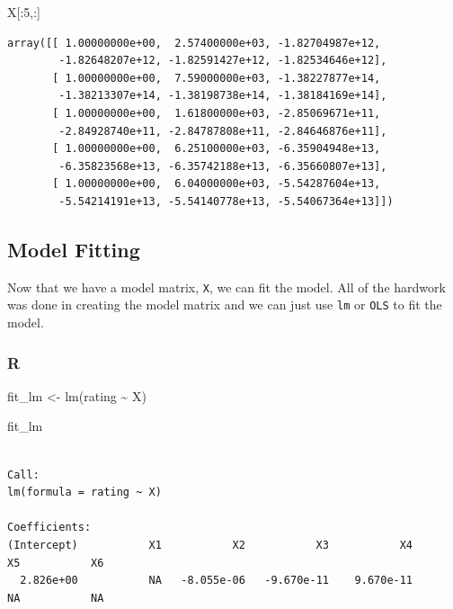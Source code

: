 \documentclass[
  letterpaper,
]{krantz}
\newenvironment{Shaded}{}{}
\newcommand{\DecValTok}[1]{\textcolor[rgb]{0.25,0.63,0.44}{#1}}
\newcommand{\FunctionTok}[1]{\textcolor[rgb]{0.02,0.16,0.49}{#1}}
\newcommand{\NormalTok}[1]{#1}
\newcommand{\OtherTok}[1]{\textcolor[rgb]{0.00,0.44,0.13}{#1}}
\newcommand{\SpecialCharTok}[1]{\textcolor[rgb]{0.25,0.44,0.63}{#1}}
\begin{document}
\begin{Shaded}
\begin{Highlighting}[]
\NormalTok{X[:}\DecValTok{5}\NormalTok{,:]}
\end{Highlighting}
\end{Shaded}

\begin{verbatim}
array([[ 1.00000000e+00,  2.57400000e+03, -1.82704987e+12,
        -1.82648207e+12, -1.82591427e+12, -1.82534646e+12],
       [ 1.00000000e+00,  7.59000000e+03, -1.38227877e+14,
        -1.38213307e+14, -1.38198738e+14, -1.38184169e+14],
       [ 1.00000000e+00,  1.61800000e+03, -2.85069671e+11,
        -2.84928740e+11, -2.84787808e+11, -2.84646876e+11],
       [ 1.00000000e+00,  6.25100000e+03, -6.35904948e+13,
        -6.35823568e+13, -6.35742188e+13, -6.35660807e+13],
       [ 1.00000000e+00,  6.04000000e+03, -5.54287604e+13,
        -5.54214191e+13, -5.54140778e+13, -5.54067364e+13]])
\end{verbatim}

\subsection{Model Fitting}\label{model-fitting-3}

Now that we have a model matrix, \texttt{X}, we can fit the model. All
of the hardwork was done in creating the model matrix and we can just
use \texttt{lm} or \texttt{OLS} to fit the model.

\subsubsection{R}

\begin{Shaded}
\begin{Highlighting}[]
\NormalTok{fit\_lm }\OtherTok{\textless{}{-}} \FunctionTok{lm}\NormalTok{(rating }\SpecialCharTok{\textasciitilde{}}\NormalTok{ X)}

\NormalTok{fit\_lm}
\end{Highlighting}
\end{Shaded}

\begin{verbatim}

Call:
lm(formula = rating ~ X)

Coefficients:
(Intercept)           X1           X2           X3           X4           X5           X6  
  2.826e+00           NA   -8.055e-06   -9.670e-11    9.670e-11           NA           NA  
\end{verbatim}
\end{document}
